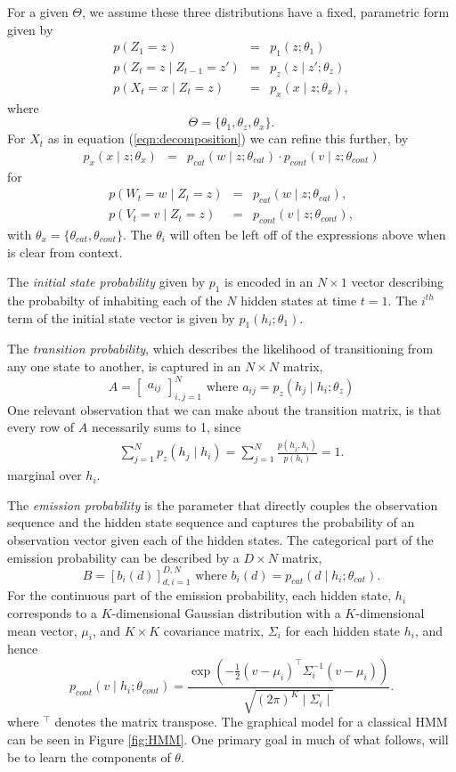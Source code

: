\documentclass{amsart}
\begin{document}
For a given $\Theta$, we assume 
these three distributions have a fixed, parametric form given by 
\begin{eqnarray*}
p(Z_1=z) &=& p_1(z;\theta_1)\\
p(Z_t = z\mid Z_{t-1}=z') & = & p_z(z\mid z';\theta_z)\\
p(X_t=x\mid Z_t=z) & = &p_x(x\mid z;\theta_x),
\end{eqnarray*} 
where 
\[
\Theta = \{\theta_1,\theta_z,\theta_x\}.
\]
For $X_t$ as in equation (\ref{eqn:decomposition}) we can refine this further, 
by
\begin{eqnarray*}
p_x(x\mid z;\theta_x)& = &p_{cat}(w\mid z; \theta_{cat})\cdot p_{cont}(v\mid z; \theta_{cont})
\end{eqnarray*}
for
\begin{eqnarray*}
p(W_t=w\mid Z_t=z) & = & p_{cat}(w\mid z; \theta_{cat}),\\
p(V_t=v\mid Z_t=z) & = & p_{cont}(v\mid z; \theta_{cont}),
\end{eqnarray*}
with $\theta_x = \{\theta_{cat},\theta_{cont}\}$.
The $\theta_i$ will often be left off of the expressions above when is clear 
from context. 

The {\em initial state probability} given by $p_1$ is encoded in an $N\times 1$ 
vector describing the probabilty of inhabiting each of the $N$ hidden states at 
time $t=1$.  The $i^{th}$ term of the initial state vector is given by  
$p_1(h_i; \theta_1)$. 

The {\em transition probability}, which describes the 
likelihood of transitioning from any one state to another, is captured in an 
$N\times N$ matrix, 
\[
A=\begin{bmatrix}
a_{ij}
\end{bmatrix}_{i,j=1}^N \text{ where }a_{ij} = p_z(h_j\mid h_i;\theta_z)
\]
One relevant observation that we can make about the transition matrix, is that 
every row of $A$ necessarily sums to 1, since 
\begin{eqnarray}\label{eqn:transitionsum}
\sum_{j=1}^Np_z(h_j\mid h_i)=\sum_{j=1}^N\frac{p(h_j,h_i)}{p(h_i)}=1.
\end{eqnarray}
marginal over $h_i$.

The {\em emission probability} is the parameter that directly 
couples the observation sequence and the hidden 
state sequence and captures the probability of an observation vector given each 
of the hidden states. The categorical part of the emission probability can be 
described by a $D\times N$ matrix, 
\[
B = \left[b_{i}(d)\right]_{d,i=1}^{D,N}\text{ where }b_{i}(d) =p_{cat}(d\mid h_i; \theta_{cat}).
\]
For the continuous part of the emission probability, each hidden state, $h_i$ 
corresponds to a $K$-dimensional Gaussian distribution with a 
$K$-dimensional mean vector, $\mu_i$, 
and $K\times K$ covariance matrix, $\Sigma_i$ for each hidden state $h_i$, and 
hence 
\[
p_{cont}(v\mid 
h_i;\theta_{cont})=\frac{\exp\left(-\frac{1}{2}\left(v-\mu_i\right)^\intercal\Sigma_i^{-1}
\left(v-\mu_i\right)\right)}{\sqrt{(2\pi)^K\mid \Sigma_i\mid}}.
\]
where $^\intercal$ denotes the matrix transpose. The graphical model for a classical HMM can 
be seen in Figure \ref{fig:HMM}.  One primary goal in much of what follows, will be to learn the components of 
$\theta$.
\end{document}
